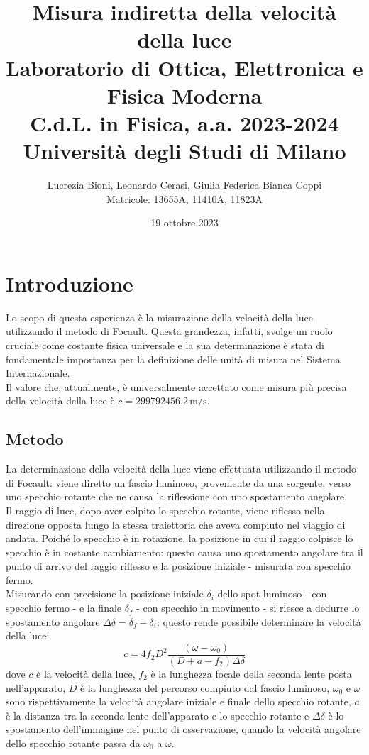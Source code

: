 \documentclass[]{article}
\title{%
    \Huge Misura indiretta della velocità della luce \\
    \Large Laboratorio di Ottica, Elettronica e Fisica Moderna \\ C.d.L. in Fisica, a.a. 2023-2024 \\ Università degli Studi di Milano}
\author{\LARGE Lucrezia Bioni, Leonardo Cerasi, Giulia Federica Bianca Coppi \\ Matricole: 13655A, 11410A, 11823A}
\date{19 ottobre 2023}
\let\oldsection\section%
\renewcommand{\section}{%
	\renewcommand{\theequation}{\thesection.\arabic{equation}}%
	\oldsection}%
\let\oldsubsection\subsection%
\renewcommand{\subsection}{%
	\renewcommand{\theequation}{\thesubsection.\arabic{equation}}%
	\oldsubsection}%
\begin{document}
    \maketitle

    \section{Introduzione}

    Lo scopo di questa esperienza è la misurazione della velocità della luce utilizzando 
    il metodo di Focault. Questa grandezza, infatti, svolge un ruolo cruciale come costante 
    fisica universale e la sua determinazione è stata di fondamentale importanza per la definizione 
    delle unità di misura nel Sistema Internazionale. \\
    Il valore che, attualmente, è universalmente accettato come misura più precisa della velocità della luce è $\bar{c} = 299792456.2 \,\text{m/s}$.

    \subsection{Metodo}
    
    La determinazione della velocità della luce viene effettuata utilizzando il metodo di Focault: 
    viene diretto un fascio luminoso, proveniente da una sorgente, verso uno specchio rotante che ne causa la riflessione con uno spostamento angolare.\\
    Il raggio di luce, dopo aver colpito lo specchio rotante, viene riflesso nella direzione opposta lungo la stessa traiettoria che aveva compiuto nel viaggio di andata. Poiché lo specchio è in rotazione, la posizione in cui il raggio colpisce lo specchio è in costante cambiamento: questo causa uno spostamento angolare tra il punto di arrivo del raggio riflesso e la posizione iniziale - misurata con specchio fermo.\\
    Misurando con precisione la posizione iniziale $ \delta _i $ dello spot luminoso - con specchio fermo - e la finale  $ \delta _f $ - con specchio in movimento - si riesce a dedurre lo spostamento angolare $ \Delta \delta = \delta_f - \delta_i $: questo rende possibile determinare la velocità della luce:
    \begin{equation}
        \label{eqn-c}
        c=4 f_2 D^2 \frac{(\omega -\omega_0)}{(D+a-f_2)\Delta \delta }
    \end{equation}
    dove $ c $ è la velocità della luce, $ f_2 $ è la lunghezza focale della seconda lente posta nell'apparato, $ D $ è la lunghezza del percorso compiuto dal fascio luminoso, $ \omega_0 $ e $ \omega $ sono rispettivamente la velocità angolare iniziale e finale dello specchio rotante, $ a $ è la distanza tra la seconda lente dell'apparato e lo specchio rotante e $ \Delta\delta$ è lo spostamento dell'immagine nel punto di osservazione, quando la velocità angolare dello specchio rotante passa da $ \omega_0 $ a $ \omega $.
\end{document}
